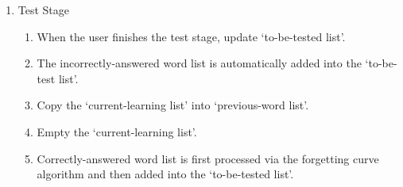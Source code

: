 \documentclass[conference]{IEEEtran}
\begin{document}
\begin{enumerate}
\begin{enumerate}
\begin{enumerate}
        \end{enumerate}
    \item Test Stage
        \begin{enumerate}
        \item When the user finishes the test stage, update ‘to-be-tested list’.
        \item The incorrectly-answered word list is automatically added into the ‘to-be-test list’.
        \item Copy the ‘current-learning list’ into ‘previous-word list’.
        \item Empty the ‘current-learning list’.
        \item Correctly-answered word list is first processed via the forgetting curve algorithm and then added into the ‘to-be-tested list’.
        \end{enumerate}
    \end{enumerate}
\end{enumerate}
\end{document}
